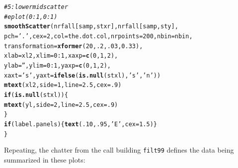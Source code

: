\documentclass{article}\usepackage[]{graphicx}\usepackage[]{color}
\makeatletter
\newcommand{\hlnum}[1]{\textcolor[rgb]{0.686,0.059,0.569}{#1}}%
\newcommand{\hlstr}[1]{\textcolor[rgb]{0.192,0.494,0.8}{#1}}%
\newcommand{\hlcom}[1]{\textcolor[rgb]{0.678,0.584,0.686}{\textit{#1}}}%
\newcommand{\hlopt}[1]{\textcolor[rgb]{0,0,0}{#1}}%
\newcommand{\hlstd}[1]{\textcolor[rgb]{0.345,0.345,0.345}{#1}}%
\newcommand{\hlkwa}[1]{\textcolor[rgb]{0.161,0.373,0.58}{\textbf{#1}}}%
\newcommand{\hlkwc}[1]{\textcolor[rgb]{0.333,0.667,0.333}{#1}}%
\newcommand{\hlkwd}[1]{\textcolor[rgb]{0.737,0.353,0.396}{\textbf{#1}}}%
\newenvironment{kframe}{%
 \def\at@end@of@kframe{}%
 \ifinner\ifhmode%
  \def\at@end@of@kframe{\end{minipage}}%
  \begin{minipage}{\columnwidth}%
 \fi\fi%
 \def\FrameCommand##1{\hskip\@totalleftmargin \hskip-\fboxsep
 \colorbox{shadecolor}{##1}\hskip-\fboxsep
     \hskip-\linewidth \hskip-\@totalleftmargin \hskip\columnwidth}%
 \MakeFramed {\advance\hsize-\width
   \@totalleftmargin\z@ \linewidth\hsize
   \@setminipage}}%
 {\par\unskip\endMakeFramed%
 \at@end@of@kframe}
\newenvironment{knitrout}{}{} %
\makeatother
\begin{document}
\begin{knitrout}
\begin{kframe}
\begin{alltt}
  \hlcom{# 5: lower mid scatter}
  \hlcom{#eplot(0:1,0:1)}
  \hlkwd{smoothScatter}\hlstd{(nrfall[samp,stxr], nrfall[samp,sty],}
                \hlkwc{pch}\hlstd{=}\hlstr{'.'}\hlstd{,} \hlkwc{cex}\hlstd{=}\hlnum{2}\hlstd{,} \hlkwc{col}\hlstd{=the.dot.col,} \hlkwc{nrpoints}\hlstd{=}\hlnum{200}\hlstd{,} \hlkwc{nbin}\hlstd{=nbin,}
                \hlkwc{transformation}\hlstd{=}\hlkwd{xformer}\hlstd{(}\hlnum{20}\hlstd{,}\hlnum{.2}\hlstd{,}\hlnum{.03}\hlstd{,}\hlnum{0.33}\hlstd{),}
                \hlkwc{xlab}\hlstd{=xl2,} \hlkwc{xlim}\hlstd{=}\hlnum{0}\hlopt{:}\hlnum{1}\hlstd{,} \hlkwc{xaxp}\hlstd{=}\hlkwd{c}\hlstd{(}\hlnum{0}\hlstd{,}\hlnum{1}\hlstd{,}\hlnum{2}\hlstd{),}
                \hlkwc{ylab}\hlstd{=}\hlstr{''}\hlstd{,}  \hlkwc{ylim}\hlstd{=}\hlnum{0}\hlopt{:}\hlnum{1}\hlstd{,} \hlkwc{yaxp}\hlstd{=}\hlkwd{c}\hlstd{(}\hlnum{0}\hlstd{,}\hlnum{1}\hlstd{,}\hlnum{2}\hlstd{),}
                \hlkwc{xaxt}\hlstd{=}\hlstr{'s'}\hlstd{,} \hlkwc{yaxt}\hlstd{=}\hlkwd{ifelse}\hlstd{(}\hlkwd{is.null}\hlstd{(stxl),}\hlstr{'s'}\hlstd{,}\hlstr{'n'}\hlstd{))}
  \hlkwd{mtext}\hlstd{(xl2,} \hlkwc{side}\hlstd{=}\hlnum{1}\hlstd{,} \hlkwc{line}\hlstd{=}\hlnum{2.5}\hlstd{,} \hlkwc{cex}\hlstd{=}\hlnum{.9}\hlstd{)}
  \hlkwa{if}\hlstd{(}\hlkwd{is.null}\hlstd{(stxl))\{}
    \hlkwd{mtext}\hlstd{(yl,} \hlkwc{side}\hlstd{=}\hlnum{2}\hlstd{,} \hlkwc{line}\hlstd{=}\hlnum{2.5}\hlstd{,} \hlkwc{cex}\hlstd{=}\hlnum{.9}\hlstd{)}
  \hlstd{\}}
  \hlkwa{if}\hlstd{(label.panels)\{}\hlkwd{text}\hlstd{(}\hlnum{.10}\hlstd{,} \hlnum{.95}\hlstd{,} \hlstr{'E'}\hlstd{,} \hlkwc{cex}\hlstd{=}\hlnum{1.5}\hlstd{)\}}
\hlstd{\}}
\end{alltt}
\end{kframe}
\end{knitrout}

Repeating, the chatter from the call building \texttt{filt99} defines the data being summarized in these plots:
\end{document}
